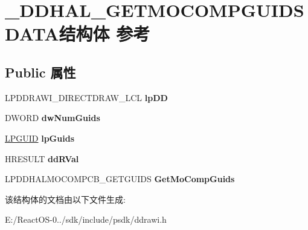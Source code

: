 \hypertarget{struct___d_d_h_a_l___g_e_t_m_o_c_o_m_p_g_u_i_d_s_d_a_t_a}{}\section{\+\_\+\+D\+D\+H\+A\+L\+\_\+\+G\+E\+T\+M\+O\+C\+O\+M\+P\+G\+U\+I\+D\+S\+D\+A\+T\+A结构体 参考}
\label{struct___d_d_h_a_l___g_e_t_m_o_c_o_m_p_g_u_i_d_s_d_a_t_a}
\subsection*{Public 属性}
\begin{DoxyCompactItemize}
\item 
\mbox{\label{struct___d_d_h_a_l___g_e_t_m_o_c_o_m_p_g_u_i_d_s_d_a_t_a_a8b56353866de5cf0343f49cdd672a50d}} 
L\+P\+D\+D\+R\+A\+W\+I\+\_\+\+D\+I\+R\+E\+C\+T\+D\+R\+A\+W\+\_\+\+L\+CL {\bfseries lp\+DD}
\item 
\mbox{\label{struct___d_d_h_a_l___g_e_t_m_o_c_o_m_p_g_u_i_d_s_d_a_t_a_a89018b9da1919e0495dbba86f3a5e1b8}} 
D\+W\+O\+RD {\bfseries dw\+Num\+Guids}
\item 
\mbox{\label{struct___d_d_h_a_l___g_e_t_m_o_c_o_m_p_g_u_i_d_s_d_a_t_a_a87b036964f65a6af43b706dcce6ffaea}} 
\hyperlink{interface_g_u_i_d}{L\+P\+G\+U\+ID} {\bfseries lp\+Guids}
\item 
\mbox{\label{struct___d_d_h_a_l___g_e_t_m_o_c_o_m_p_g_u_i_d_s_d_a_t_a_aa35f8618fa8a0c0b14cdd2f02267c3b6}} 
H\+R\+E\+S\+U\+LT {\bfseries dd\+R\+Val}
\item 
\mbox{\label{struct___d_d_h_a_l___g_e_t_m_o_c_o_m_p_g_u_i_d_s_d_a_t_a_a8e965e220b32c69c9f7b24999ea2992b}} 
L\+P\+D\+D\+H\+A\+L\+M\+O\+C\+O\+M\+P\+C\+B\+\_\+\+G\+E\+T\+G\+U\+I\+DS {\bfseries Get\+Mo\+Comp\+Guids}
\end{DoxyCompactItemize}


该结构体的文档由以下文件生成\+:\begin{DoxyCompactItemize}
\item 
E\+:/\+React\+O\+S-\/0../sdk/include/psdk/ddrawi.\+h\end{DoxyCompactItemize}
